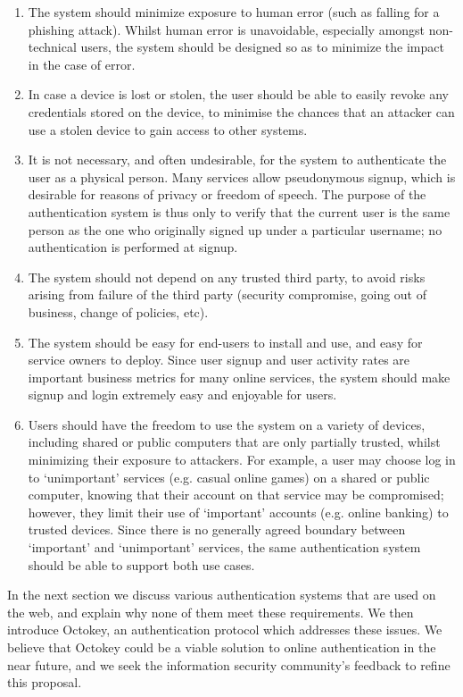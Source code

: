 \begin{enumerate}
\item The system should minimize exposure to human error (such as falling for a phishing attack).
Whilst human error is unavoidable, especially amongst non-technical users, the system should be
designed so as to minimize the impact in the case of error.
\item In case a device is lost or stolen, the user should be able to easily revoke any credentials
stored on the device, to minimise the chances that an attacker can use a stolen device to gain
access to other systems.
\item It is not necessary, and often undesirable, for the system to authenticate the user as a
physical person. Many services allow pseudonymous signup, which is desirable for reasons of privacy
or freedom of speech. The purpose of the authentication system is thus only to verify that the
current user is the same person as the one who originally signed up under a particular username; no
authentication is performed at signup.
\item The system should not depend on any trusted third party, to avoid risks arising from failure
of the third party (security compromise, going out of business, change of policies, etc).
\item The system should be easy for end-users to install and use, and easy for service owners to
deploy. Since user signup and user activity rates are important business metrics for many online
services, the system should make signup and login extremely easy and enjoyable for users.
\item Users should have the freedom to use the system on a variety of devices, including shared or
public computers that are only partially trusted, whilst minimizing their exposure to attackers.
For example, a user may choose log in to `unimportant' services (e.g. casual online games) on a
shared or public computer, knowing that their account on that service may be compromised; however,
they limit their use of `important' accounts (e.g. online banking) to trusted devices. Since there
is no generally agreed boundary between `important' and `unimportant' services, the same
authentication system should be able to support both use cases.
\end{enumerate}

In the next section we discuss various authentication systems that are used on the web, and explain
why none of them meet these requirements. We then introduce Octokey, an authentication protocol
which addresses these issues. We believe that Octokey could be a viable solution to online
authentication in the near future, and we seek the information security community's feedback to
refine this proposal.

